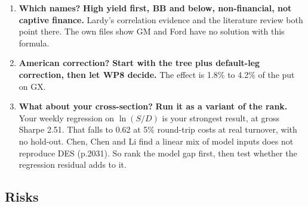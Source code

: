\documentclass[10pt,a4paper]{article}
\begin{document}
\begin{enumerate}[itemsep=3pt]
\item \textbf{Which names?} \textbf{High yield first, BB and below, non-financial, not captive finance.} Lardy's correlation evidence and the literature review both point there. The own files show GM and Ford have no solution with this formula.
\item \textbf{American correction?} \textbf{Start with the tree plus default-leg correction, then let WP8 decide.} The effect is 1.8\% to 4.2\% of the put on GX.
\item \textbf{What about your cross-section?} \textbf{Run it as a variant of the rank.} Your weekly regression on $\ln(S/D)$ is your strongest result, at gross Sharpe 2.51. That falls to 0.62 at 5\% round-trip costs at real turnover, with no hold-out. Chen, Chen and Li find a linear mix of model inputs does not reproduce DES (p.2031). So rank the model gap first, then test whether the regression residual adds to it.
\end{enumerate}

\subsection*{Risks}
\end{document}
